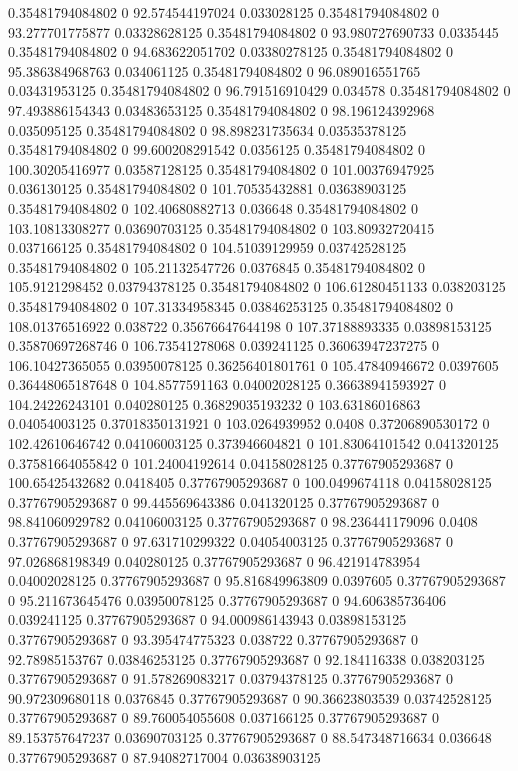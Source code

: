 0.35481794084802 0 92.574544197024 0.033028125
0.35481794084802 0 93.277701775877 0.03328628125
0.35481794084802 0 93.980727690733 0.0335445
0.35481794084802 0 94.683622051702 0.03380278125
0.35481794084802 0 95.386384968763 0.034061125
0.35481794084802 0 96.089016551765 0.03431953125
0.35481794084802 0 96.791516910429 0.034578
0.35481794084802 0 97.493886154343 0.03483653125
0.35481794084802 0 98.196124392968 0.035095125
0.35481794084802 0 98.898231735634 0.03535378125
0.35481794084802 0 99.600208291542 0.0356125
0.35481794084802 0 100.30205416977 0.03587128125
0.35481794084802 0 101.00376947925 0.036130125
0.35481794084802 0 101.70535432881 0.03638903125
0.35481794084802 0 102.40680882713 0.036648
0.35481794084802 0 103.10813308277 0.03690703125
0.35481794084802 0 103.80932720415 0.037166125
0.35481794084802 0 104.51039129959 0.03742528125
0.35481794084802 0 105.21132547726 0.0376845
0.35481794084802 0 105.9121298452 0.03794378125
0.35481794084802 0 106.61280451133 0.038203125
0.35481794084802 0 107.31334958345 0.03846253125
0.35481794084802 0 108.01376516922 0.038722
0.35676647644198 0 107.37188893335 0.03898153125
0.35870697268746 0 106.73541278068 0.039241125
0.36063947237275 0 106.10427365055 0.03950078125
0.36256401801761 0 105.47840946672 0.0397605
0.36448065187648 0 104.8577591163 0.04002028125
0.36638941593927 0 104.24226243101 0.040280125
0.36829035193232 0 103.63186016863 0.04054003125
0.37018350131921 0 103.0264939952 0.0408
0.37206890530172 0 102.42610646742 0.04106003125
0.373946604821 0 101.83064101542 0.041320125
0.37581664055842 0 101.24004192614 0.04158028125
0.37767905293687 0 100.65425432682 0.0418405
0.37767905293687 0 100.0499674118 0.04158028125
0.37767905293687 0 99.445569643386 0.041320125
0.37767905293687 0 98.841060929782 0.04106003125
0.37767905293687 0 98.236441179096 0.0408
0.37767905293687 0 97.631710299322 0.04054003125
0.37767905293687 0 97.026868198349 0.040280125
0.37767905293687 0 96.421914783954 0.04002028125
0.37767905293687 0 95.816849963809 0.0397605
0.37767905293687 0 95.211673645476 0.03950078125
0.37767905293687 0 94.606385736406 0.039241125
0.37767905293687 0 94.000986143943 0.03898153125
0.37767905293687 0 93.395474775323 0.038722
0.37767905293687 0 92.78985153767 0.03846253125
0.37767905293687 0 92.184116338 0.038203125
0.37767905293687 0 91.578269083217 0.03794378125
0.37767905293687 0 90.972309680118 0.0376845
0.37767905293687 0 90.36623803539 0.03742528125
0.37767905293687 0 89.760054055608 0.037166125
0.37767905293687 0 89.153757647237 0.03690703125
0.37767905293687 0 88.547348716634 0.036648
0.37767905293687 0 87.94082717004 0.03638903125
